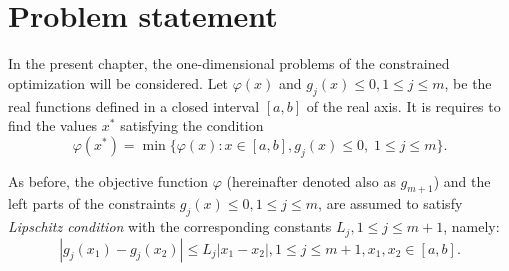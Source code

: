 
\section{Problem statement}
In the present chapter, the one-dimensional problems of the constrained optimization will
be considered. Let $\varphi(x)$ and $g_j(x)\le 0,1\le j\le m$, be the real functions defined in a closed interval $[a,b]$ of the real axis. It is requires to find the values $x^*$ satisfying the condition
\begin{equation}
  \label{eq4:problem}
  \varphi(x^*)=\min\{\varphi(x):x\in [a,b], g_j(x)\le 0,\; 1\le j\le m\}.
\end{equation}

As before, the objective function $\varphi$ (hereinafter denoted also as $g_{m+1}$) and the left parts of the constraints $g_j(x)\le 0,1\le j\le m$, are assumed to satisfy \emph{Lipschitz condition} with the corresponding constants $L_j,1\le j\le m+1$, namely:
\begin{equation}
  \label{eq4:lip_condition}
  |g_j(x_1)-g_j(x_2)|\le L_j|x_1-x_2|,1\le j\le m+1,x_1,x_2\in [a,b].
\end{equation}


